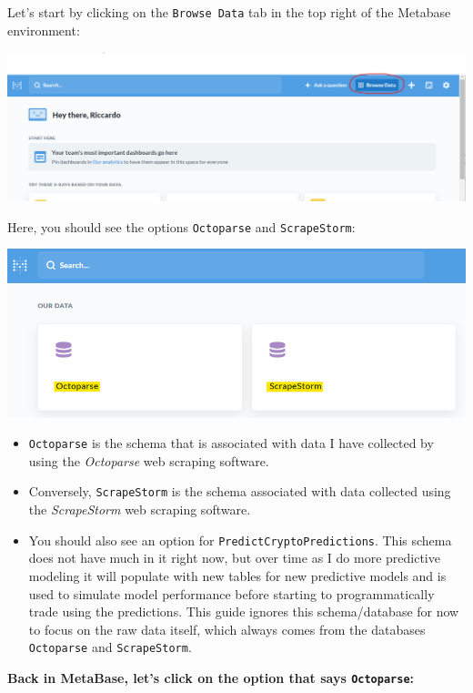 \documentclass[
]{book}
\begin{document}
Let's start by clicking on the \texttt{Browse\ Data} tab in the top right of the Metabase environment:

\includegraphics{images/MetabaseBrowseData.png}

Here, you should see the options \texttt{Octoparse} and \texttt{ScrapeStorm}:

\includegraphics{images/DBSelection.png}

\begin{itemize}
\item
  \texttt{Octoparse} is the schema that is associated with data I have collected by using the \emph{Octoparse} web scraping software.
\item
  Conversely, \texttt{ScrapeStorm} is the schema associated with data collected using the \emph{ScrapeStorm} web scraping software.
\item
  You should also see an option for \texttt{PredictCryptoPredictions}. This schema does not have much in it right now, but over time as I do more predictive modeling it will populate with new tables for new predictive models and is used to simulate model performance before starting to programmatically trade using the predictions. This guide ignores this schema/database for now to focus on the raw data itself, which always comes from the databases \texttt{Octoparse} and \texttt{ScrapeStorm}.
\end{itemize}

\textbf{Back in MetaBase, let's click on the option that says \texttt{Octoparse}:}
\end{document}

